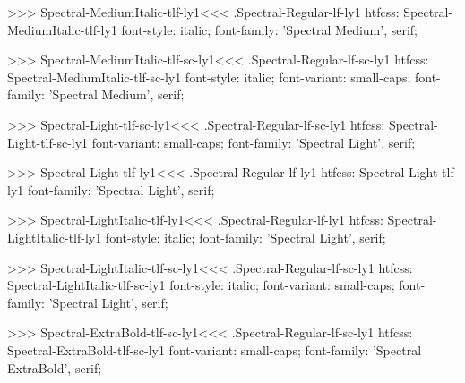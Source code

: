 >>>
\<Spectral-MediumItalic-tlf-ly1\><<<
.Spectral-Regular-lf-ly1
htfcss:  Spectral-MediumItalic-tlf-ly1  font-style: italic; font-family: 'Spectral Medium', serif;

>>>
\<Spectral-MediumItalic-tlf-sc-ly1\><<<
.Spectral-Regular-lf-sc-ly1
htfcss:  Spectral-MediumItalic-tlf-sc-ly1  font-style: italic; font-variant: small-caps; font-family: 'Spectral Medium', serif;

>>>
\<Spectral-Light-tlf-sc-ly1\><<<
.Spectral-Regular-lf-sc-ly1
htfcss:  Spectral-Light-tlf-sc-ly1  font-variant: small-caps; font-family: 'Spectral Light', serif;

>>>
\<Spectral-Light-tlf-ly1\><<<
.Spectral-Regular-lf-ly1
htfcss:  Spectral-Light-tlf-ly1  font-family: 'Spectral Light', serif;

>>>
\<Spectral-LightItalic-tlf-ly1\><<<
.Spectral-Regular-lf-ly1
htfcss:  Spectral-LightItalic-tlf-ly1  font-style: italic; font-family: 'Spectral Light', serif;

>>>
\<Spectral-LightItalic-tlf-sc-ly1\><<<
.Spectral-Regular-lf-sc-ly1
htfcss:  Spectral-LightItalic-tlf-sc-ly1  font-style: italic; font-variant: small-caps; font-family: 'Spectral Light', serif;

>>>
\<Spectral-ExtraBold-tlf-sc-ly1\><<<
.Spectral-Regular-lf-sc-ly1
htfcss:  Spectral-ExtraBold-tlf-sc-ly1  font-variant: small-caps; font-family: 'Spectral ExtraBold', serif;

